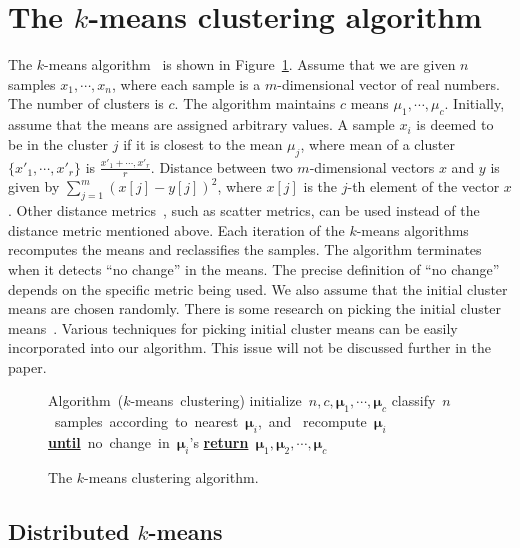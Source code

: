 
\section{The $k$-means clustering algorithm}
\label{sec:k-means}

The $k$-means algorithm~\cite{pattern-classification,Llyod-82} is
shown in Figure~\ref{fig:k-means}. Assume that we are given $n$
samples $x_1,\cdots,x_n$, where each sample is a $m$-dimensional
vector of real numbers. The number of clusters is $c$. The algorithm
maintains $c$ means $\mu_1,\cdots,\mu_c$. Initially, assume that the
means are assigned arbitrary values. A sample $x_i$ is deemed to be in
the cluster $j$ if it is closest to the mean $\mu_j$, where mean of a
cluster $\{x'_1,\cdots,x'_r \}$ is
$\frac{x'_1+\cdots,x'_r}{r}$. Distance between two $m$-dimensional
vectors $x$ and $y$ is given by $\sum_{j=1}^m (x[j] - y[j])^2$, where
$x[j]$ is the $j$-th element of the vector $x$.  Other distance
metrics~\cite[Chapter 10]{pattern-classification}, such as scatter
metrics, can be used instead of the distance metric mentioned above.
Each iteration of the $k$-means algorithms recomputes the means and
reclassifies the samples. The algorithm terminates when it detects
``no change'' in the means. The precise definition of ``no change''
depends on the specific metric being used. We also assume that the
initial cluster means are chosen randomly. There is some research on
picking the initial cluster means~\cite{Initial:kmeans}. Various
techniques for picking initial cluster means can be easily
incorporated into our algorithm. This issue will not be discussed
further in the paper.


\begin{figure}
\begin{center}
\begin{programbox}
\mbox{Algorithm ($k$-means clustering)}
\BEGIN \mbox{initialize $n,c,\mathbf{\mu}_1,\cdots,\mathbf{\mu}_c$}
	\DO \mbox{classify $n$ samples according to nearest $\mathbf{\mu}_i$, and }
	    \mbox{recompute $\mathbf{\mu}_i$}
	\mbox{{\bf \underline{until}} no change in $\mathbf{\mu}_i$'s}
 \mbox{{\bf \underline{return}} $\mathbf{\mu}_1,\mathbf{\mu}_2,\cdots,\mathbf{\mu}_c$}
\END
\end{programbox}
\end{center}
\caption{The $k$-means clustering algorithm.}
\label{fig:k-means}
\end{figure}

\subsection{Distributed $k$-means}

